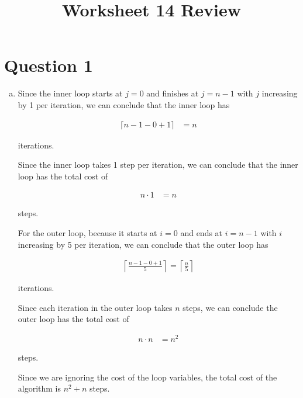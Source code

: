 \documentclass[12pt]{article}
\begin{document}
\title{Worksheet 14 Review}
\maketitle

\section*{Question 1}
\begin{enumerate}[a.]
    \item

    Since the inner loop starts at $j = 0$ and finishes at $j = n-1$ with $j$
    increasing by 1 per iteration, we can conclude that the inner loop has

    \begin{align}
        \lceil n - 1 - 0 + 1 \rceil &= n
    \end{align}

    iterations.

    \bigskip

    Since the inner loop takes 1 step per iteration, we can conclude that the
    inner loop has the total cost of

    \begin{align}
        n \cdot 1 &= n
    \end{align}

    steps.

    \bigskip

    For the outer loop, because it starts at $i = 0$ and ends at $i = n-1$ with $i$
    increasing by 5 per iteration, we can conclude that the outer loop has

    \begin{align}
        \left\lceil \frac{n-1-0+1}{5} \right\rceil = \left\lceil \frac{n}{5} \right\rceil
    \end{align}

    iterations.

    \bigskip

    Since each iteration in the outer loop takes $n$ steps, we can conclude the
    outer loop has the total cost of

    \begin{align}
        n \cdot n &= n^2
    \end{align}

    steps.

    \bigskip

    Since we are ignoring the cost of the loop variables, the total cost of the
    algorithm is $n^2 + n$ steps.


\end{enumerate}
\end{document}
